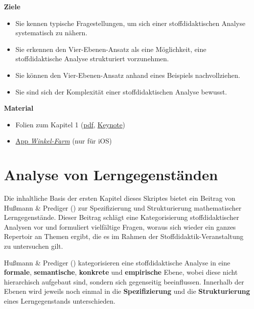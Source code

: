 \documentclass[
]{scrbook}
\providecommand{\tightlist}{%
  \setlength{\itemsep}{0pt}\setlength{\parskip}{0pt}}
\renewenvironment{quote}{
  \list{}{
	\leftmargin0.2cm   %
    \rightmargin\leftmargin
      	\def\FrameCommand
    {%
        {\color{quoteColor}\vrule width 2pt}%
        \hspace{0pt}%
    }%
    \MakeFramed{\advance \hsize -\width \FrameRestore}    \color{quoteColor}
    }
  \item\relax
}
{\endlist\color{black}\endMakeFramed}
\theoremstyle{definition}
\theoremstyle{definition}
\theoremstyle{definition}
\theoremstyle{definition}
\theoremstyle{remark}
\begin{document}
\begin{quote}
\textbf{Ziele}

\begin{itemize}
\tightlist
\item
  Sie kennen typische Fragestellungen, um sich einer stoffdidaktischen Analyse systematisch zu nähern.
\item
  Sie erkennen den Vier-Ebenen-Ansatz als eine Möglichkeit, eine stoffdidaktische Analyse strukturiert vorzunehmen.
\item
  Sie können den Vier-Ebenen-Ansatz anhand eines Beispiels nachvollziehen.
\item
  Sie sind sich der Komplexität einer stoffdidaktischen Analyse bewusst.
\end{itemize}

\textbf{Material}

\begin{itemize}
\tightlist
\item
  Folien zum Kapitel 1 (\href{files/Stoffdidaktik2024-01-VierEbenenAnsatz.pdf}{pdf}, \href{files/Stoffdidaktik2024-01-VierEbenenAnsatz.key}{Keynote})
\item
  \href{https://apps.apple.com/de/app/winkel-farm/id1369585218}{App \emph{Winkel-Farm}} (nur für iOS)
\end{itemize}
\end{quote}

\section{Analyse von Lerngegenständen}\label{analyse-von-lerngegenstuxe4nden}

Die inhaltliche Basis der ersten Kapitel dieses Skriptes bietet ein Beitrag von Hußmann \& Prediger () zur Spezifizierung und Strukturierung mathematischer Lerngegenstände. Dieser Beitrag schlägt eine Kategorisierung stoffdidaktischer Analysen vor und formuliert vielfältige Fragen, woraus sich wieder ein ganzes Repertoir an Themen ergibt, die es im Rahmen der Stoffdidaktik-Veranstaltung zu untersuchen gilt.

Hußmann \& Prediger () kategorisieren eine stoffdidaktische Analyse in eine \textbf{\textcolor{formalColor}{formale}}, \textbf{\textcolor{semanticColor}{semantische}}, \textbf{\textcolor{concreteColor}{konkrete}} und \textbf{\textcolor{empiricColor}{empirische}} Ebene, wobei diese nicht hierarchisch aufgebaut sind, sondern sich gegenseitig beeinflussen. Innerhalb der Ebenen wird jeweils noch einmal in die \textbf{Spezifizierung} und die \textbf{Strukturierung} eines Lerngegenstands unterschieden.
\end{document}
